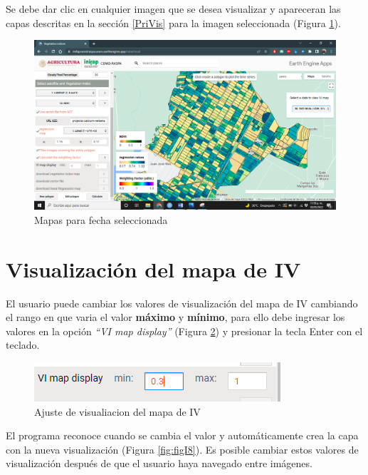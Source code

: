 \documentclass[
]{book}
\begin{document}
Se debe dar clic en cualquier imagen que se desea visualizar y apareceran las capas descritas en la sección \ref{PriVis} para la imagen seleccionada (Figura \ref{fig:figI6}).

\begin{figure}

{\centering \includegraphics[width=0.85\linewidth]{./images/Figure56} 

}

\caption{Mapas para fecha seleccionada}\label{fig:figI6}
\end{figure}

\hypertarget{visualizaciuxf3n-del-mapa-de-iv}{%
\section{Visualización del mapa de IV}\label{visualizaciuxf3n-del-mapa-de-iv}}

El usuario puede cambiar los valores de visualización del mapa de IV cambiando el rango en que varia el valor \textbf{máximo} y \textbf{mínimo}, para ello debe ingresar los valores en la opción \emph{``VI map display''} (Figura \ref{fig:figI7}) y presionar la tecla Enter con el teclado.

\begin{figure}

{\centering \includegraphics{./images/Figure57} 

}

\caption{Ajuste de visualiacion del mapa de IV}\label{fig:figI7}
\end{figure}

El programa reconoce cuando se cambia el valor y automáticamente crea la capa con la nueva visualización (Figura \ref{fig:figI8}). Es posible cambiar estos valores de visualización después de que el usuario haya navegado entre imágenes.
\end{document}
